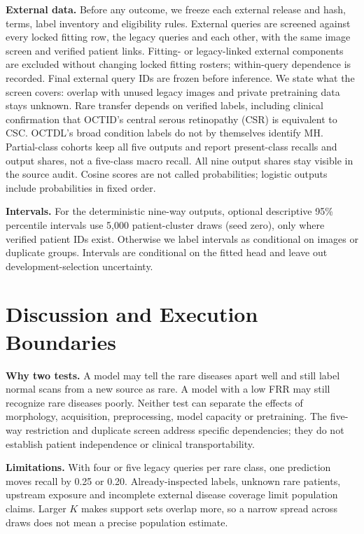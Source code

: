 \documentclass[conference]{IEEEtran}
\newcommand{\claim}[1]{} %
\begin{document}
\claim{C25}
\textbf{External data.} Before any outcome, we freeze each external release and hash, terms, label inventory and eligibility rules. External queries are screened against every locked fitting row, the legacy queries and each other, with the same image screen and verified patient links. Fitting- or legacy-linked external components are excluded without changing locked fitting rosters; within-query dependence is recorded. Final external query IDs are frozen before inference. We state what the screen covers: overlap with unused legacy images and private pretraining data stays unknown. Rare transfer depends on verified labels, including clinical confirmation that OCTID's central serous retinopathy (CSR) is equivalent to CSC. OCTDL's broad condition labels do not by themselves identify MH. Partial-class cohorts keep all five outputs and report present-class recalls and output shares, not a five-class macro recall. All nine output shares stay visible in the source audit. Cosine scores are not called probabilities; logistic outputs include probabilities in fixed order.

\claim{C26}
\textbf{Intervals.} For the deterministic nine-way outputs, optional descriptive 95\% percentile intervals use 5,000 patient-cluster draws (seed zero), only where verified patient IDs exist. Otherwise we label intervals as conditional on images or duplicate groups. Intervals are conditional on the fitted head and leave out development-selection uncertainty.

\section{Discussion and Execution Boundaries}
\claim{C27}
\textbf{Why two tests.} A model may tell the rare diseases apart well and still label normal scans from a new source as rare. A model with a low FRR may still recognize rare diseases poorly. Neither test can separate the effects of morphology, acquisition, preprocessing, model capacity or pretraining. The five-way restriction and duplicate screen address specific dependencies; they do not establish patient independence or clinical transportability.

\claim{C28}
\textbf{Limitations.} With four or five legacy queries per rare class, one prediction moves recall by 0.25 or 0.20. Already-inspected labels, unknown rare patients, upstream exposure and incomplete external disease coverage limit population claims. Larger $K$ makes support sets overlap more, so a narrow spread across draws does not mean a precise population estimate.
\end{document}
